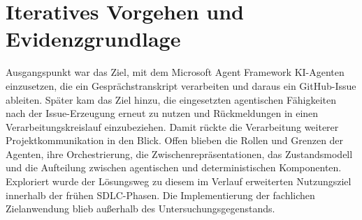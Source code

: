 %
%
%

\section{Iteratives Vorgehen und Evidenzgrundlage}
\label{sec:iteratives-vorgehen-evidenz}

Ausgangspunkt war das Ziel, mit dem Microsoft Agent Framework
KI-Agenten einzusetzen, die ein Gesprächstranskript verarbeiten und
daraus ein GitHub-Issue ableiten. Später kam das Ziel hinzu, die
eingesetzten agentischen Fähigkeiten nach der Issue-Erzeugung erneut
zu nutzen und Rückmeldungen in einen Verarbeitungskreislauf
einzubeziehen. Damit rückte die Verarbeitung weiterer
Projektkommunikation in den Blick. Offen blieben die Rollen und
Grenzen der Agenten, ihre Orchestrierung, die Zwischenrepräsentationen,
das Zustandsmodell und die Aufteilung zwischen agentischen und
deterministischen Komponenten. Exploriert wurde der Lösungsweg zu
diesem im Verlauf erweiterten Nutzungsziel innerhalb der frühen
SDLC-Phasen. Die Implementierung der fachlichen Zielanwendung blieb
außerhalb des Untersuchungsgegenstands.


